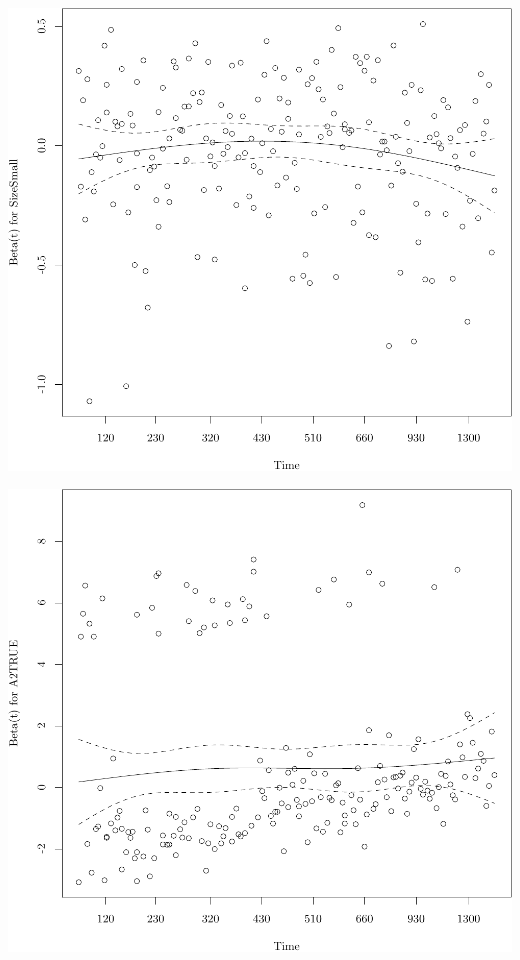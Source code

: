 \documentclass{article}\usepackage[]{graphicx}\usepackage[]{color}
\makeatletter
\def\maxwidth{ %
  \ifdim\Gin@nat@width>\linewidth
    \linewidth
  \else
    \Gin@nat@width
  \fi
}
\newenvironment{knitrout}{}{} %
\makeatother
\begin{document}
\begin{knitrout}
{}




{\centering \includegraphics[width=\maxwidth]{figure/05-eda-ph-check-full-6} 

}




{\centering \includegraphics[width=\maxwidth]{figure/05-eda-ph-check-full-7} 

}
\end{knitrout}
\end{document}
